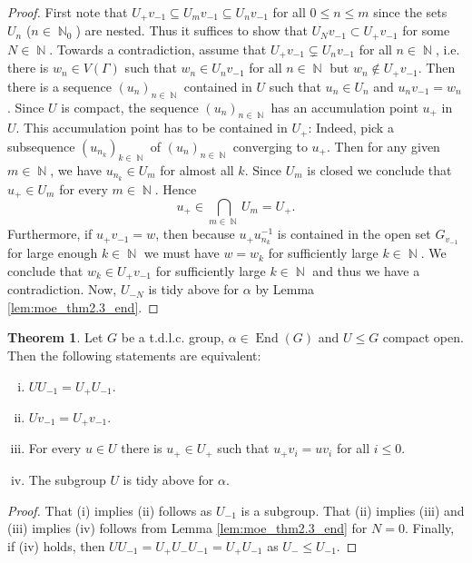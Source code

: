 \documentclass{article}
\DeclareMathOperator\End{End}
\DeclareMathOperator\bbN{\mathbb{N}}
\theoremstyle{definition}
\newtheorem{theorem}{Theorem}[section]
\begin{document}
\begin{proof}
First note that $U_{+}v_{-1}\subseteq U_{m}v_{-1}\subseteq U_{n}v_{-1}$ for all $0\le n\le m$ since the sets $U_{n}$ ($n\in\bbN_{0}$) are nested. Thus it suffices to show that $U_{N}v_{-1}\subset U_{+}v_{-1}$ for some $N\in\bbN$. Towards a contradiction, assume that $U_{+}v_{-1}\subsetneq U_{n}v_{-1}$ for all $n\in\bbN$,
i.e. there is $w_{n}\in V(\Gamma)$ such that $w_{n}\in U_{n}v_{-1}$ for all $n\in\bbN$ but $w_{n}\not\in U_{+}v_{-1}$. Then there is a sequence  $(u_{n})_{n\in\bbN}$ contained in $U$ such that $u_{n}\in U_{n}$ and $u_{n}v_{-1}=w_{n}$. Since $U$ is compact, the sequence $(u_{n})_{n\in\bbN}$ has an accumulation point $u_{+}$ in $U$. This accumulation point has to be contained in $U_{+}$: Indeed, pick a subsequence $(u_{n_{k}})_{k\in\bbN}$ of $(u_{n})_{n\in\bbN}$ converging to $u_{+}$. Then for any given $m\in\bbN$, we have $u_{n_{k}}\in U_{m}$ for almost all $k$. Since $U_{m}$ is closed we conclude that $u_{+}\in U_{m}$ for every $m\in\bbN$. Hence
\begin{displaymath}
 u_{+}\in\bigcap_{m\in\bbN}U_{m}=U_{+}.
\end{displaymath}
Furthermore, if $u_{+}v_{-1}=w$, then because $u_{+}u_{n_{k}}^{-1}$ is contained in the open set $G_{v_{-1}}$ for large enough $k\in\bbN$ we must have $w = w_k$ for sufficiently large $k\in\bbN$. We conclude that $w_k\in U_{+}v_{-1}$ for sufficiently large $k\in\bbN$ and thus we have a contradiction. Now, $U_{-N}$ is tidy above for $\alpha$ by Lemma \ref{lem:moe_thm2.3_end}.
\end{proof}

\begin{theorem}\label{thm:tidy_above}
Let $G$ be a t.d.l.c. group, $\alpha\in\End(G)$ and $U\le G$ compact open. Then the following statements are equivalent:
\begin{enumerate}[(i)]
  \item\label{item:thm_tidy_above_cosets} $UU_{-1} = U_+U_{-1}$.
  \item $Uv_{-1}=U_{+}v_{-1}$.
  \item\label{item:thm_tidy_above_U_+_action} For every $u\in U$ there is $u_{+}\in U_{+}$ such that $u_{+}v_{i}=uv_{i}$ for all $i\le 0$.
  \item The subgroup $U$ is tidy above for $\alpha$.
\end{enumerate}
\end{theorem}
\begin{proof}
That (i) implies (ii) follows as $U_{-1}$ is a subgroup. That (ii) implies (iii) and (iii) implies (iv) follows from Lemma \ref{lem:moe_thm2.3_end} for $N = 0$.	
Finally, if (iv) holds, then $UU_{-1}=U_{+}U_{-}U_{-1}=U_{+}U_{-1}$ as $U_{-}\le U_{-1}$.
\end{proof}
\end{document}
